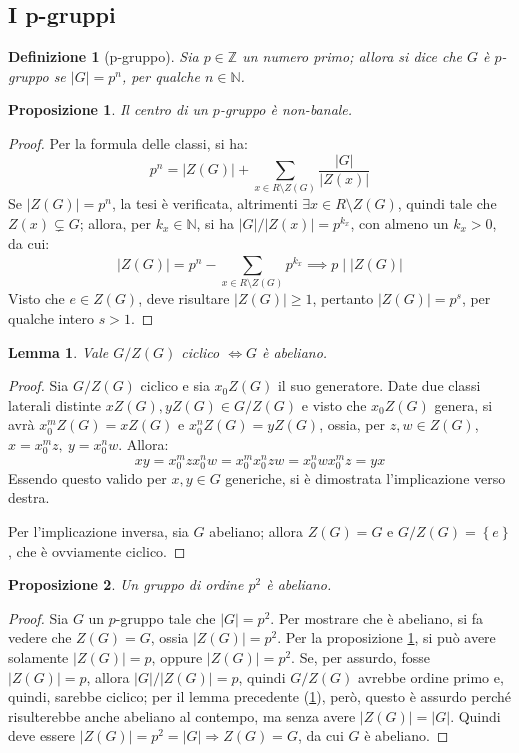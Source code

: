 \documentclass[12pt]{scrartcl}
\theoremstyle{style}
\newtheorem{definizione}{Definizione}[section]
\newtheorem{prop}{Proposizione}[section]
\newtheorem{lemma}{Lemma}[teorema]
\numberwithin{equation}{subsection}
\begin{document}
\subsection{I p-gruppi}
\begin{definizione}
	[p-gruppo]
	Sia $p \in \mathbb{Z}$ un numero primo; allora si dice che $G$ \`e $p$-gruppo se $\lvert G \rvert = p^n$, per qualche $n \in \mathbb{N}$.
\end{definizione}
\begin{prop}\label{pnb}
	Il centro di un $p$-gruppo \`e non-banale.
\end{prop} 
	\begin{proof}
		Per la formula delle classi, si ha:
		\[
		p^n = \lvert Z(G) \rvert  + \sum_{x \in R \setminus Z(G)}^{} \frac{\lvert G \rvert }{\lvert Z(x) \rvert }
		\] 
		Se $\lvert Z(G) \rvert  = p^n$, la tesi \`e verificata, altrimenti $\exists x \in R \setminus Z(G)$, quindi tale che $Z(x) \subsetneq G$; allora, per $k_x\in \mathbb{N}$, si ha $\lvert G \rvert / \lvert Z(x) \rvert = p^{k_x} $, con almeno un $k_x > 0$, da cui:
		\[
		\lvert Z(G) \rvert =p^n - \sum_{x \in R \setminus Z(G)}^{} p^{k_x} \implies p  \mid \lvert Z(G) \rvert 
		\] 
		Visto che $e \in Z(G)$, deve risultare $\lvert Z(G) \rvert \ge 1$, pertanto $\lvert Z(G) \rvert = p^s$, per qualche intero $s > 1$.
	\end{proof}
\begin{lemma}\label{GZGciffban}
	Vale $G / Z(G)$ ciclico $\iff G$ \`e abeliano.
\end{lemma}
	\begin{proof}
		Sia $G / Z(G)$ ciclico e sia $x_0 Z(G)$ il suo generatore.
		Date due classi laterali distinte $xZ(G), yZ(G) \in G / Z(G)$ e visto che $x_0Z(G)$ genera, si avr\`a $x_0^m Z(G)= x Z(G)$ e $x_0^nZ(G) = yZ(G)$, ossia, per $z,w \in Z(G)$, $x = x_0^m z,\ y = x_0^n w$. 
		Allora:
		\[
			 xy = x_0^m z x_0^n w = x_0^m x_0^n zw = x_0^n wx_0^m z = yx
		\] 
	Essendo questo valido per $x,y \in G$ generiche, si \`e dimostrata l'implicazione verso destra.

	Per l'implicazione inversa, sia $G$ abeliano; allora $Z(G) = G$ e $G / Z(G) = \left\{ e \right\} $, che \`e ovviamente ciclico.
	\end{proof}
\begin{prop}
	Un gruppo di ordine $p^2$ \`e abeliano.
\end{prop}
	\begin{proof}
		Sia $G$ un $p$-gruppo tale che $\lvert G \rvert  = p^2$. Per mostrare che \`e abeliano, si fa vedere che $Z(G) = G$, ossia $\lvert Z(G) \rvert  = p^2$.
		Per la proposizione \ref{pnb}, si pu\`o avere solamente $\lvert Z(G) \rvert = p$, oppure $\lvert Z(G) \rvert = p ^2$.
		Se, per assurdo, fosse $\lvert Z(G) \rvert =p$, allora $\lvert G \rvert / \lvert Z(G) \rvert = p$, quindi $G / Z(G)$ avrebbe ordine primo e, quindi, sarebbe ciclico; per il lemma precedente (\ref{GZGciffban}), per\`o, questo \`e assurdo perch\'e risulterebbe anche abeliano al contempo, ma senza avere $\lvert Z(G) \rvert  = \lvert G \rvert $.
		Quindi deve essere $\lvert Z(G) \rvert  = p^2 = \lvert G \rvert \Rightarrow Z(G) = G$, da cui $G$ \`e abeliano.
	\end{proof}
\end{document}
